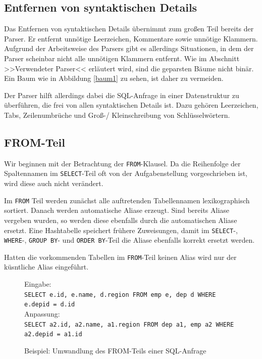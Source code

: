 \subsection{Entfernen von syntaktischen Details}

Das Entfernen von syntaktischen Details übernimmt zum großen Teil bereits der Parser. Er entfernt unnötige Leerzeichen, Kommentare sowie unnötige Klammern. Aufgrund der Arbeitsweise des Parsers gibt es allerdings Situationen, in dem der Parser scheinbar nicht alle unnötigen Klammern entfernt. Wie im Abschnitt >>Verwendeter Parser<< erläutert wird, sind die geparsten Bäume nicht binär. Ein Baum wie in Abbildung \ref{baum1} zu sehen, ist daher zu vermeiden. 

Der Parser hilft allerdings dabei die SQL-Anfrage in einer Datenstruktur zu überführen, die frei von allen syntaktischen Details ist. Dazu gehören Leerzeichen, Tabs, Zeilenumbrüche und Groß-/ Kleinschreibung von Schlüsselwörtern.

\subsection{FROM-Teil}
\label{subsec:from}

Wir beginnen mit der Betrachtung der \verb|FROM|-Klausel. Da die Reihenfolge der Spaltennamen im \verb|SELECT|-Teil oft von der Aufgabenstellung vorgeschrieben ist, wird diese auch nicht verändert.

Im \verb|FROM| Teil werden zunächst alle auftretenden Tabellennamen lexikographisch sortiert. Danach werden automatische Aliase erzeugt. Sind bereits Aliase vergeben wurden, so werden diese ebenfalls durch die automatischen Aliase ersetzt. Eine Hashtabelle speichert frühere Zuweisungen, damit im \verb|SELECT|-, \verb|WHERE|-, \verb|GROUP BY|- und \verb|ORDER BY|-Teil die Aliase ebenfalls korrekt ersetzt werden.

Hatten die vorkommenden Tabellen im \verb|FROM|-Teil keinen Alias wird nur der küsntliche Alias eingeführt.

\begin{figure}
Eingabe: \\\verb|SELECT e.id, e.name, d.region FROM emp e, dep d WHERE e.depid = d.id|\\

Anpassung: \\\verb|SELECT a2.id, a2.name, a1.region FROM dep a1, emp a2 WHERE a2.depid = a1.id|\\
\caption{Beispiel: Umwandlung des FROM-Teils einer SQL-Anfrage}
\end{figure}

